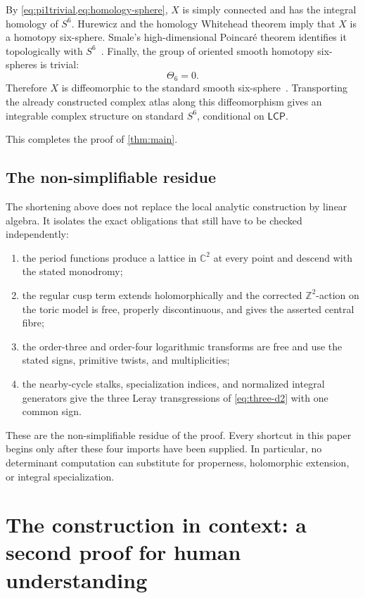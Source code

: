 \documentclass[11pt,reqno]{amsart}
\numberwithin{equation}{section}
\newcommand{\Z}{\mathbb Z}
\newcommand{\C}{\mathbb C}
\newcommand{\LCP}{\mathsf{LCP}}
\theoremstyle{definition}
\begin{document}
By \cref{eq:pi1trivial,eq:homology-sphere}, $X$ is simply connected and has the integral homology of $S^6$. Hurewicz and the homology Whitehead theorem imply that $X$ is a homotopy six-sphere. Smale's high-dimensional Poincar\'e theorem identifies it topologically with $S^6$~\cite{Smale}. Finally, the group of oriented smooth homotopy six-spheres is trivial:
\[
\Theta_6=0.
\]
Therefore $X$ is diffeomorphic to the standard smooth six-sphere~\cite{KM}. Transporting the already constructed complex atlas along this diffeomorphism gives an integrable complex structure on standard $S^6$, conditional on $\LCP$.

This completes the proof of \cref{thm:main}.

\subsection{The non-simplifiable residue}\label{sec:residue}

The shortening above does not replace the local analytic construction by linear algebra. It isolates the exact obligations that still have to be checked independently:
\begin{enumerate}[label=\textup{(R\arabic*)}]
\item the period functions produce a lattice in $\C^2$ at every point and descend with the stated monodromy;
\item the regular cusp term extends holomorphically and the corrected $\Z^2$-action on the toric model is free, properly discontinuous, and gives the asserted central fibre;
\item the order-three and order-four logarithmic transforms are free and use the stated signs, primitive twists, and multiplicities;
\item the nearby-cycle stalks, specialization indices, and normalized integral generators give the three Leray transgressions of \cref{eq:three-d2} with one common sign.
\end{enumerate}
These are the non-simplifiable residue of the proof. Every shortcut in this paper begins only after these four imports have been supplied. In particular, no determinant computation can substitute for properness, holomorphic extension, or integral specialization.

\section{The construction in context: a second proof for human understanding}\label{sec:explanation}
\end{document}
